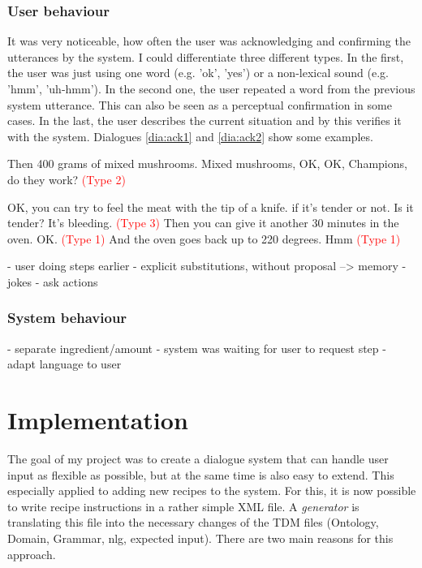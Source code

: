 \documentclass[
	11pt, %
]{fphw}
\newenvironment{mydialogue}
    {\begin{tcolorbox}[colback=color_background]\begin{dialogue}}
    {\end{dialogue}\end{tcolorbox}}
\begin{document}
\subsubsection*{User behaviour}
It was very noticeable, how often the user was acknowledging and confirming the utterances by the system. I could differentiate three different types. In the first, the user was just using one word (e.g. 'ok', 'yes') or a non-lexical sound (e.g. 'hmm', 'uh-hmm'). In the second one, the user repeated a word from the previous system utterance. This can also be seen as a perceptual confirmation in some cases. In the last, the user describes the current situation and by this verifies it with the system. Dialogues \ref{dia:ack1} and \ref{dia:ack2} show some examples.

\begin{mydialogue}
     Then 400 grams of mixed mushrooms. 
     Mixed mushrooms, OK, OK, Champions, do they work? \textcolor{red}{(Type 2)}

    \label{dia:ack1}
\end{mydialogue}

\begin{mydialogue}
     OK, you can try to feel the meat with the tip of a knife. if it's tender or not. Is it tender?
     It's bleeding. \textcolor{red}{(Type 3)}
     Then you can give it another 30 minutes in the oven. 
     OK. \textcolor{red}{(Type 1)}
     And the oven goes back up to 220 degrees. 
     Hmm \textcolor{red}{(Type 1)}

    \label{dia:ack2}
\end{mydialogue}

- user doing steps earlier
- explicit substitutions, without proposal
    --> memory
- jokes
- ask actions

\subsubsection*{System behaviour}
- separate ingredient/amount
- system was waiting for user to request step
- adapt language to user


\section*{Implementation}
The goal of my project was to create a dialogue system that can handle user input as flexible as possible, but at the same time is also easy to extend. This especially applied to adding new recipes to the system. For this, it is now possible to write recipe instructions in a rather simple XML file. A \emph{generator} is translating this file into the necessary changes of the TDM files (Ontology, Domain, Grammar, nlg, expected input). There are two main reasons for this approach. 
\end{document}
